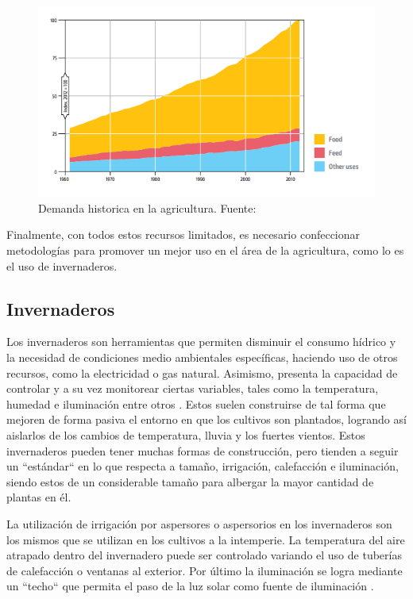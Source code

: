 \documentclass[12pt,a4paper]{article}
\newcommand{\tarea}[1]{
{\huge\color{red}{#1}}
}
\begin{document}
\begin{figure}[h!]
  \centering
    \includegraphics[scale=0.7]{imagenes/Food and non-food agricultural demand historical trends cut.png}
  \caption{Demanda historica en la agricultura. Fuente: \parencite{FAO2018}}
  \label{fig:FAOFOOD}
\end{figure}

Finalmente, con todos estos recursos limitados, es necesario confeccionar metodologías para promover un mejor uso en el área de la agricultura, como lo es el uso de invernaderos.

\subsection{Invernaderos}
\tarea{agregar ejemplos con fotos}
	Los invernaderos son herramientas que permiten disminuir el  consumo hídrico y la necesidad de condiciones medio ambientales específicas, haciendo uso de otros recursos, como la electricidad o gas natural. Asimismo, presenta la capacidad de controlar y a su vez monitorear ciertas variables, tales como la temperatura, humedad e iluminación entre otros \parencite{Specht2014}. Estos suelen construirse de tal forma que mejoren de forma pasiva el entorno en que los cultivos son plantados, logrando así aislarlos de los cambios de temperatura, lluvia y los fuertes vientos. Estos invernaderos pueden tener muchas formas de construcción, pero tienden a seguir un ``estándar`` en lo que respecta a tamaño, irrigación, calefacción e iluminación, siendo estos de un considerable tamaño para albergar la mayor cantidad de plantas en él. 

	La utilización de irrigación por aspersores o aspersorios en los invernaderos son los mismos que se utilizan en los cultivos a la intemperie. La temperatura del aire atrapado dentro del invernadero puede ser controlado variando el uso de tuberías de calefacción o ventanas al exterior. Por último la iluminación se logra mediante un ``techo`` que permita el paso de la luz solar como fuente de iluminación \parencite{Specht2014}.
	
\end{document}
